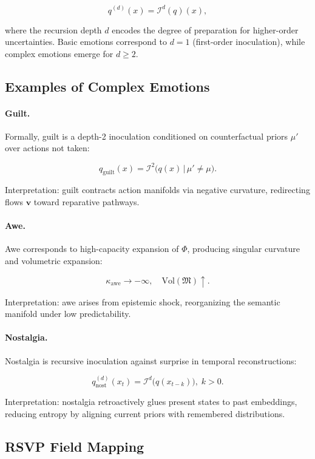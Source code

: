 \documentclass{article}
\theoremstyle{definition}
\begin{document}
\[
q^{(d)}(x) = \mathcal{I}^d(q)(x),
\]

where the recursion depth $d$ encodes the degree of preparation for 
higher-order uncertainties. Basic emotions correspond to $d=1$ 
(first-order inoculation), while complex emotions emerge for $d \geq 2$.

\subsection{Examples of Complex Emotions}

\paragraph{Guilt.}  
Formally, guilt is a depth-2 inoculation conditioned on 
counterfactual priors $\mu'$ over actions not taken:

\[
q_{\text{guilt}}(x) 
= \mathcal{I}^2 \big( q(x) \,\big|\, \mu' \neq \mu \big).
\]

Interpretation: guilt contracts action manifolds via negative curvature, 
redirecting flows $\mathbf{v}$ toward reparative pathways.

\paragraph{Awe.}  
Awe corresponds to high-capacity expansion of $\Phi$, producing 
singular curvature and volumetric expansion:

\[
\kappa_{\text{awe}} \to -\infty, 
\quad \mathrm{Vol}(\mathfrak{M}) \uparrow.
\]

Interpretation: awe arises from epistemic shock, reorganizing the 
semantic manifold under low predictability.

\paragraph{Nostalgia.}  
Nostalgia is recursive inoculation against surprise in temporal 
reconstructions:

\[
q^{(d)}_{\text{nost}}(x_t) 
= \mathcal{I}^d\big(q(x_{t-k})\big),\; k>0.
\]

Interpretation: nostalgia retroactively glues present states to 
past embeddings, reducing entropy by aligning current priors 
with remembered distributions.

\subsection{RSVP Field Mapping}
\end{document}
